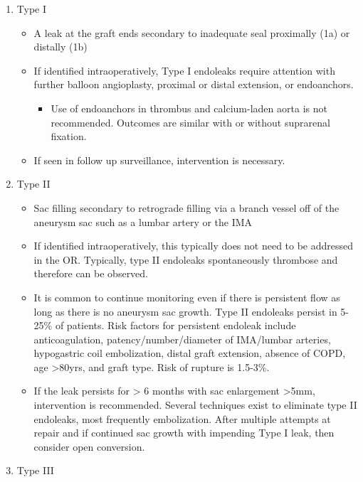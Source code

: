 \documentclass[
]{book}
\providecommand{\tightlist}{%
  \setlength{\itemsep}{0pt}\setlength{\parskip}{0pt}}
\begin{document}
\begin{enumerate}
\def\labelenumi{\arabic{enumi}.}
\item
  Type I

  \begin{itemize}
  \item
    A leak at the graft ends secondary to inadequate seal proximally
    (1a) or distally (1b)
  \item
    If identified intraoperatively, Type I endoleaks require
    attention with further balloon angioplasty, proximal or distal
    extension, or endoanchors.

    \begin{itemize}
    \tightlist
    \item
      Use of endoanchors in thrombus and calcium-laden aorta is
      not recommended.\citep{jordan2014} Outcomes are similar with or
      without suprarenal fixation.
    \end{itemize}
  \item
    If seen in follow up surveillance, intervention is necessary.
  \end{itemize}
\item
  Type II

  \begin{itemize}
  \item
    Sac filling secondary to retrograde filling via a branch vessel
    off of the aneurysm sac such as a lumbar artery or the IMA
  \item
    If identified intraoperatively, this typically does not need to
    be addressed in the OR. Typically, type II endoleaks
    spontaneously thrombose and therefore can be observed.
  \item
    It is common to continue monitoring even if there is persistent
    flow as long as there is no aneurysm sac growth. Type II
    endoleaks persist in 5-25\% of patients. Risk factors for
    persistent endoleak include anticoagulation\citep{bobadilla2010},
    patency/number/diameter of IMA/lumbar arteries\citep{ward2014},
    hypogastric coil embolization, distal graft extension, absence
    of COPD, age \textgreater80yrs, and graft type. Risk of rupture is
    1.5-3\%.\citep{lo2016, abularrage2010, timaran2004, shalaby2016, sarac2012, jones2007}
  \item
    If the leak persists for \textgreater{} 6 months with sac enlargement \textgreater5mm,
    intervention is recommended. Several techniques exist to
    eliminate type II endoleaks, most frequently embolization. After
    multiple attempts at repair and if continued sac growth with
    impending Type I leak, then consider open
    conversion.\citep{kelso2009, mohapatra2019}
  \end{itemize}
\item
  Type III


\end{enumerate}
\end{document}
